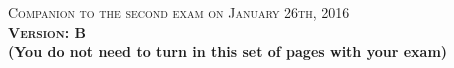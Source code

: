 \documentclass{docist}
\begin{document}
\thispagestyle{empty}

\begin{center}
  {\Large \textsc{Companion to the second exam on January 26th, 2016\\[2ex]
  \textbf{Version: B}\\[2ex]}}
  {\normalsize  \textbf{(You do not need to turn in this set of pages with your exam)}}
\end{center}




\qSOAPipesFiltersTwo


\qAllocationTwo


\qnginxTwo


\qContinousIntegrationViewsTwo


\qInfinispanViewsTwo


\qWebTwoTwo


\qMicroservicesArchitectureTwo


\qAmazonTwo


\qScalableArchitectureTwo


\qGraphiteScenarioTacticsTwo


\qGraphiteViewsTwo


\qArchitectureInfluenceCycleTwo


\qRequirementsTwo


\qArchitectureDefinitionTwo


\qAdventureBuilderTwo

\end{document}
